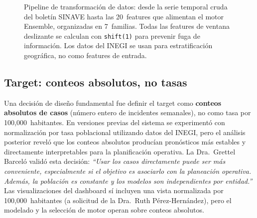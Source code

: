 \documentclass[12pt, letterpaper]{article}
\begin{document}
\begin{figure}[H]
\caption[Pipeline de ingeniería de características.]{Pipeline de transformación de datos: desde la serie temporal cruda del boletín SINAVE hasta las 20~features que alimentan el motor Ensemble, organizadas en 7~familias. Todas las features de ventana deslizante se calculan con \texttt{shift(1)} para prevenir fuga de información. Los datos del INEGI se usan para estratificación geográfica, no como features de entrada.}
\label{fig:feature_pipeline}
\end{figure}

\subsection{Target: conteos absolutos, no tasas}

Una decisión de diseño fundamental fue definir el target como \textbf{conteos absolutos de casos} (número entero de incidentes semanales), no como tasa por 100,000~habitantes. En versiones previas del sistema se experimentó con normalización por tasa poblacional utilizando datos del INEGI, pero el análisis posterior reveló que los conteos absolutos producían pronósticos más estables y directamente interpretables para la planificación operativa. La Dra.~Grettel Barceló validó esta decisión: \textit{``Usar los casos directamente puede ser más conveniente, especialmente si el objetivo es asociarlo con la planeación operativa. Además, la población es constante y los modelos son independientes por entidad.''} Las visualizaciones del dashboard sí incluyen una vista normalizada por 100,000~habitantes (a solicitud de la Dra.~Ruth Pérez-Hernández), pero el modelado y la selección de motor operan sobre conteos absolutos.
\end{document}
